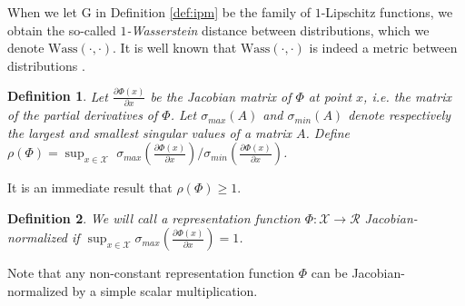 \documentclass{article}
\newtheorem{thmappdef}{Definition}
\def\cX{\mathcal X}
\def\cF{\mathrm{G}}
\def\cR{\mathcal{R}}
\newcommand{\Jphix}{\frac{\partial \Phi (x)}{\partial x}}
\begin{document}
When we let $\cF$ in Definition \ref{def:ipm} be the family of $1$-Lipschitz functions, we obtain the so-called \emph{$1$-Wasserstein} distance between distributions, which we denote $\text{Wass}(\cdot,\cdot)$.
It is well known that $\text{Wass}(\cdot,\cdot)$ is indeed a metric between distributions \cite{villani2008optimal}.




\begin{thmappdef}\label{def:rcondA}
Let $\Jphix$ be the Jacobian matrix of $\Phi$ at point $x$, i.e. the matrix of the partial derivatives of $\Phi$. Let $\sigma_{max}(A)$ and $\sigma_{min}(A)$ denote respectively the largest and smallest singular values of a matrix $A$.
Define $\rho(\Phi) = \sup_{x \in \cX} \, \, \sigma_{max}\left(\Jphix\right) / \sigma_{min}\left(\Jphix\right)$.
\end{thmappdef}
It is an immediate result that $\rho(\Phi) \geq 1$.

\begin{thmappdef}
We will call a representation function $\Phi : \cX \rightarrow \cR$ \emph{Jacobian-normalized} if $\sup_{x \in \cX} \sigma_{max} \left(\Jphix \right) = 1$.
\end{thmappdef}
Note that any non-constant representation function $\Phi$ can be Jacobian-normalized by a simple scalar multiplication.
\end{document}
